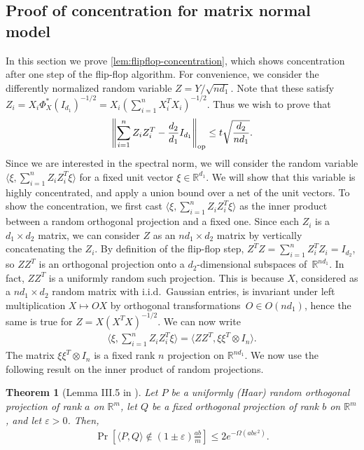 \documentclass[aos]{imsart}
\newtheorem{theorem}{Theorem}[section]
\theoremstyle{definition}
\numberwithin{equation}{section}
\DeclareMathOperator{\op}{op}
\DeclarePairedDelimiter{\norm}{\lVert}{\rVert}
\newcommand{\R}{{\mathbb{R}}}
\newcommand{\ot}{\otimes}
\newcommand{\eps}{\varepsilon}
\begin{document}
\begin{appendix}
\section{Proof of concentration for matrix normal model}\label{app:flipflop-concentration}
In this section we prove \cref{lem:flipflop-concentration}, which shows concentration after one step of the flip-flop algorithm.
For convenience, we consider the differently normalized random variable $Z = Y/\sqrt{nd_1}$.
Note that these satisfy
$Z_i = X_i \Phi_X^*(I_{d_1})^{-1/2} =  X_i (\sum_{i = 1}^n X_i^T X_i)^{-1/2}.$
Thus we wish to prove that
\begin{align}\label{eq:1marg goal}
  \norm*{\sum_{i=1}^n Z_i Z_i^T - \frac{d_2}{d_1} I_{d_1}}_{\op}
\leq t \sqrt{\frac{d_2}{nd_1}}.
\end{align}
Since we are interested in the spectral norm, we will consider the random variable $\langle \xi, \sum_{i = 1}^n Z_i Z_i^{T} \xi \rangle$ for a fixed unit vector $\xi \in \R^{d_1}$.
We will show that this variable is highly concentrated, and apply a union bound over a net of the unit vectors.
To show the concentration, we first cast $\langle \xi, \sum_{i = 1}^n Z_i Z_i^{T} \xi \rangle$ as the inner product between a random orthogonal projection and a fixed one.
Since each $Z_i$ is a $d_1 \times d_2$ matrix, we can consider $Z$ as an $n d_1 \times d_2$ matrix by vertically concatenating the $Z_i$.
By definition of the flip-flop step, $Z^T Z = \sum_{i=1}^n Z_i^T Z_i = I_{d_2}$, so $Z Z^T$ is an orthogonal projection onto a $d_2$-dimensional subspaces of~$\R^{n d_1}$.
In fact, $Z Z^T$ is a uniformly random such projection.
This is because $X$, considered as a $n d_1 \times d_2$ random matrix with i.i.d.\ Gaussian entries, is invariant under left multiplication $X \mapsto OX$ by orthogonal transformations~$O \in O(n d_1)$, hence the same is true for $Z = X (X^T X)^{-1/2}$.
We can now write
\begin{align*}
  \langle \xi,  \sum_{i = 1}^n Z_i Z_i^{T} \xi \rangle = \langle Z Z^T,  \xi \xi^T \ot I_{n} \rangle.
\end{align*}
The matrix $\xi \xi^T \otimes I_{n}$ is a fixed rank $n$ projection on $\R^{n d_1}$.
We now use the following result on the inner product of random projections.

\begin{theorem} [Lemma III.5 in \cite{hayden2006aspects}]
Let $P$ be a uniformly (Haar) random orthogonal projection of rank $a$ on $\R^{m}$, let $Q$ be a fixed orthogonal projection of rank $b$ on $\R^{m}$, and let $\eps>0$.
Then,
\begin{align*}
\Pr \left[ \langle P, Q \rangle \not\in (1 \pm \eps) \frac{ab}{m} \right] \leq 2 e^{ - \Omega( ab \eps^2 ) }.
\end{align*}
\end{theorem}


\end{appendix}
\end{document}
